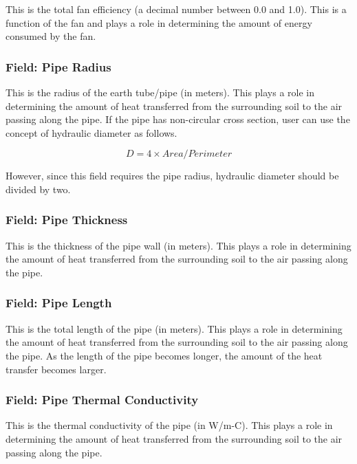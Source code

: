 This is the total fan efficiency (a decimal number between 0.0 and 1.0). This is a function of the fan and plays a role in determining the amount of energy consumed by the fan.

\subsubsection{Field: Pipe Radius}\label{field-pipe-radius}

This is the radius of the earth tube/pipe (in meters). This plays a role in determining the amount of heat transferred from the surrounding soil to the air passing along the pipe. If the pipe has non-circular cross section, user can use the concept of hydraulic diameter as follows.

\begin{equation}
D = 4 \times Area/Perimeter
\end{equation}

However, since this field requires the pipe radius, hydraulic diameter should be divided by two.

\subsubsection{Field: Pipe Thickness}\label{field-pipe-thickness}

This is the thickness of the pipe wall (in meters). This plays a role in determining the amount of heat transferred from the surrounding soil to the air passing along the pipe.

\subsubsection{Field: Pipe Length}\label{field-pipe-length}

This is the total length of the pipe (in meters). This plays a role in determining the amount of heat transferred from the surrounding soil to the air passing along the pipe. As the length of the pipe becomes longer, the amount of the heat transfer becomes larger.

\subsubsection{Field: Pipe Thermal Conductivity}\label{field-pipe-thermal-conductivity}

This is the thermal conductivity of the pipe (in W/m-C). This plays a role in determining the amount of heat transferred from the surrounding soil to the air passing along the pipe.

